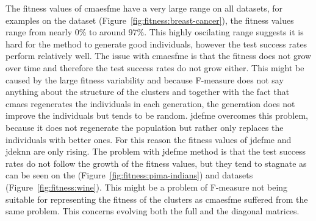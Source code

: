 \documentclass[12pt,a4paper]{report}
\begin{document}
The fitness values of \ac{cmaesfme} have a very large range on all datasets, for examples on the  dataset (Figure~\ref{fig:fitness:breast-cancer}), the fitness values range from nearly 0\% to around 97\%. This highly oscilating range suggests it is hard for the method to generate good individuals, however the test success rates perform relatively well. The issue with \ac{cmaesfme} is that the fitness does not grow over time and therefore the test success rates do not grow either. This might be caused by the large fitness variability and because F-measure does not say anything about the structure of the clusters and together with the fact that \ac{cmaes} regenerates the individuals in each generation, the generation does not improve the individuals but tends to be random. \ac{jdefme} overcomes this problem, because it does not regenerate the population but rather only replaces the individuals with better ones. For this reason the fitness values of \ac{jdefme} and \ac{jdeknn} are only rising. The problem with \ac{jdefme} method is that the test success rates do not follow the growth of the fitness values, but they tend to stagnate as can be seen on the  (Figure~\ref{fig:fitness:pima-indians}) and  datasets (Figure~\ref{fig:fitness:wine}). This might be a problem of F-measure not being suitable for representing the fitness of the clusters as \ac{cmaesfme} suffered from the same problem. This concerns evolving both the full and the diagonal matrices.

\end{document}
